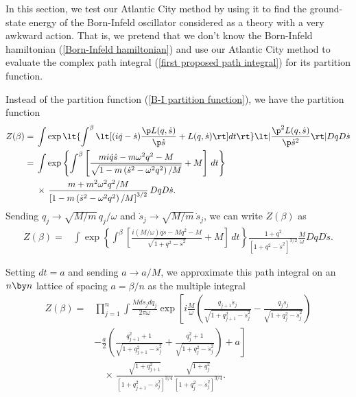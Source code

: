 \documentclass[prd,preprint,floatfix,showpacs]{revtex4-1}
\begin{document}
In this section,
we test our Atlantic City method
by using it to find the 
ground-state energy 
of the Born-Infeld oscillator
considered 
as a theory with a very awkward action.
That is, we pretend that
we don't know the Born-Infeld hamiltonian 
(\ref {Born-Infeld hamiltonian})
and use our Atlantic City method to
evaluate the complex path integral
(\ref {first proposed path integral})
for its partition function.
\par
Instead of the partition function
(\ref {B-I partition function}),
we have the partition function 
\begin{equation}
   \begin{split}
Z(\beta) ={}& \int \exp \lt\{ \int^\beta \lt[  ( i \dot q
- \dot s ) \frac{ \p  L(q, \dot s)  }{ \p \dot s }
+ L(q, \dot s) 
\rt] dt \rt\}  
\lt| \frac{ \p^2  L(q, \dot s) }
{ \p \dot s^2  }  \rt|
 Dq D\dot s
\\
={}& \int \exp\left\{
\int^\beta \left[
\frac{m i\dot q \dot s - m\omega^2 q^2 -M}
{\sqrt{1 - m \left( \dot s^2 - \omega^2 q^2 \right)/M}}
+ M \right] \, dt \right\}
\\
{}& \times \, \frac{m + m^2 \omega^2 q^2/M}
{\left[ 1 - 
m \left( \dot s ^2 - \omega^2 q^2 \right)/M\right]^{3/2}}
\, Dq D\dot s .
\label {instead of the partition function}
   \end{split}
\end{equation}
Sending \( q_j \to \sqrt{M/m} \, q_j/\omega \) and
\( \dot s_j \to \sqrt{M/m} \, \dot s_j \), 
we can write \( Z(\beta)  \) as
\begin{equation}
   \begin{split}
Z(\beta) ={}& \int \exp\left\{
\int^\beta \left[ 
\frac{i (M/\omega) \dot q \dot s - M q^2 - M}
{\sqrt{1 + q^2 - \dot s^2}}
+ M \right] \, dt \right\}
\frac{1 + q^2}
{\left[ 1 + q^2 - \dot s ^2 \right]^{3/2}}
\frac{M}{\omega} Dq D\dot s .
\label {we can write Z(beta) as}
   \end{split}
\end{equation}
\par
Setting \( dt = a \) and sending \( a \to a/M \), 
we approximate this path integral 
on an \( n \by n \) lattice
of spacing \( a = \beta/n \)
as the multiple integral
\begin{equation}
   \begin{split}
Z(\beta) ={}& \prod_{j=1}^n \int 
\frac{M d\dot s_j dq_j}{2\pi \omega} 
\exp  \left[ 
i \frac{M}{\omega} \left(
\frac{q_{j + 1} \dot s_j}
{\sqrt{1 + q^2_{j+1} - \dot s^2_j }}
- \frac{q_j  \dot s_j }
{\sqrt{1 + q^2_j - \dot s^2_j }} \right) \right.
\\
{}& \left.
- \frac{a}{2}\left(
\frac{q^2_{j+1} + 1}{\sqrt{1 + q^2_{j+1} - \dot s^2_j }}
+
\frac{q^2_j + 1}{\sqrt{1 + q^2_j - \dot s^2_j }} \right) 
+ a \right] 
\\
{}&\quad \times \, \frac{\sqrt{1 +  q^2_{j+1}}}
{\left[ 1 + q^2_{j+1} - \dot s ^2_j \right]^{3/4}}
\frac{\sqrt{1 +  q^2_j}}
{\left[ 1 + q^2_j - \dot s ^2_j \right]^{3/4}} .
\label {We approximate this path integral}
   \end{split}
\end{equation}
\end{document}
